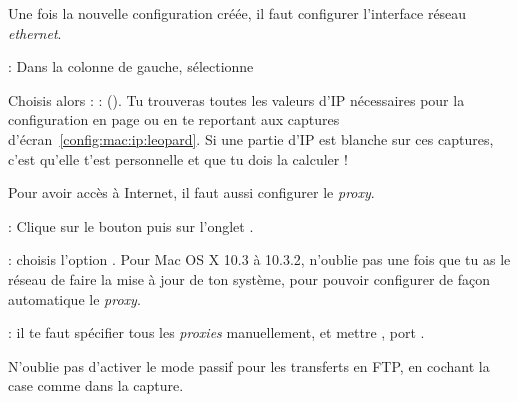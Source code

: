 

Une fois la nouvelle configuration créée, il faut configurer l'interface réseau \emph{ethernet}.





 : Dans la colonne de gauche, sélectionne 

Choisis alors  :%
 :  (). Tu trouveras toutes les valeurs d'IP nécessaires pour la configuration en page \pageref{calcul_ip} ou en te reportant aux captures d'écran~\ref{config:mac:ip:leopard}. Si une partie d'IP est blanche sur ces captures, c'est qu'elle t'est personnelle et que tu dois la calculer !


  
  



Pour avoir accès à Internet, il faut aussi configurer le \emph{proxy}.

 : Clique sur le bouton  puis sur l'onglet .


 :  choisis l'option . Pour Mac OS X 10.3 à 10.3.2, n'oublie pas une fois que tu as le réseau de faire la mise à jour de ton système, pour pouvoir configurer de façon automatique le \emph{proxy}.

 : il te faut spécifier tous les
\emph{proxies} manuellement, et mettre , port .


N'oublie pas d'activer le mode passif pour les transferts en FTP, en cochant la case comme dans la capture.


  
